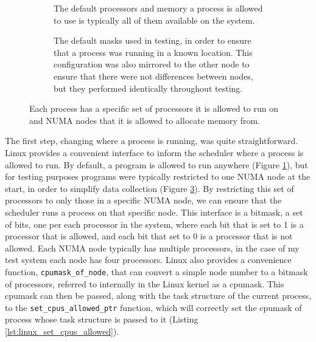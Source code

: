 \begin{figure}[H]
    \centering
    \begin{subfigure}{0.4\textwidth}
        \centering
        \resizebox{0.9\linewidth}{!}{}
        \captionsetup{width=0.9\textwidth}
        \caption{The default processors and memory a process is allowed to use is typically all of them available on the system.}
        \label{fig:defaultmasks}
    \end{subfigure}
    \begin{subfigure}{0.4\textwidth}
        \centering
        \resizebox{0.9\linewidth}{!}{}
        \captionsetup{width=0.9\textwidth}
        \caption{The default masks used in testing, in order to ensure that a process was running in a known location.
        This configuration was also mirrored to the other node to ensure that there were not differences between nodes, 
        but they performed identically throughout testing.}
        \label{fig:testingmasks}
    \end{subfigure}
    \captionsetup{width=0.8\textwidth}
    \caption{Each process has a specific set of processors it is allowed to run on and NUMA  nodes that it is allowed to allocate memory from.}
\end{figure}

The first step, changing where a process is running, was quite straightforward.
Linux provides a convenient interface to inform the scheduler where a process is allowed to run.
By default, a program is allowed to run anywhere (Figure \ref{fig:defaultmasks}), 
but for testing purposes programs were typically restricted to one NUMA node at the start, 
in order to simplify data collection (Figure \ref{fig:testingmasks}).
By restricting this set of processors to only those in a specific NUMA node,
we can ensure that the scheduler runs a process on that specific node.
This interface is a bitmask, a set of bits, one per each processor in the system, 
where each bit that is set to 1 is a processor that is allowed, and each bit that set to 0 is a processor that is not allowed.
Each NUMA node typically has multiple processors, in the case of my test system each node has four processors. 
Linux also provides a convenience function, \texttt{cpumask\_of\_node}, that can convert a simple node number to a bitmask
of processors, referred to internally in the Linux kernel as a cpumask.
This cpumask can then be passed, along with the task structure of the current process,
to the \texttt{set\_cpus\_allowed\_ptr} function, which will correctly set the cpumask of process whose
task structure is passed to it (Listing \ref{lst:linux_set_cpus_allowed}).


